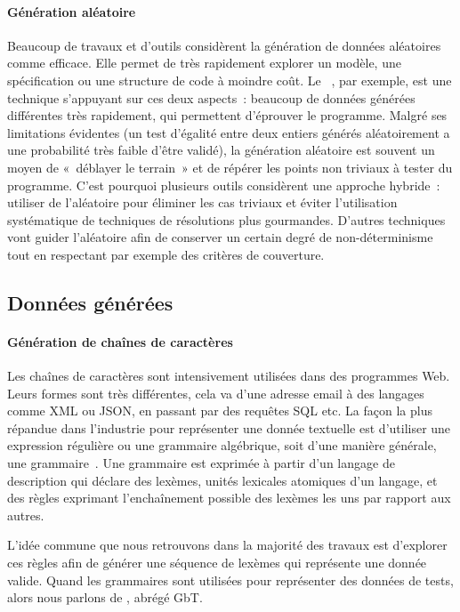 \paragraph{Génération aléatoire} Beaucoup de travaux et d'outils considèrent la
génération de données aléatoires comme efficace. Elle permet de très rapidement
explorer un modèle, une spécification ou une structure de code à moindre coût.
Le ~, par exemple, est une technique
s'appuyant sur ces deux aspects~: beaucoup de données générées différentes très
rapidement, qui permettent d'éprouver le programme. Malgré ses limitations
évidentes (un test d'égalité entre deux entiers générés aléatoirement a une
probabilité très faible d'être validé), la génération aléatoire est souvent un
moyen de «~déblayer le terrain~» et de répérer les points non triviaux à tester
du programme. C'est pourquoi plusieurs outils considèrent une approche hybride~:
utiliser de l'aléatoire pour éliminer les cas triviaux et éviter l'utilisation
systématique de techniques de résolutions plus gourmandes. D'autres techniques
vont guider l'aléatoire afin de conserver un certain degré de non-déterminisme
tout en respectant par exemple des critères de couverture.

\subsection{Données générées}

\paragraph{Génération de chaînes de caractères} Les chaînes de caractères sont
intensivement utilisées dans des programmes Web.  Leurs formes sont très
différentes, cela va d'une adresse email à des langages comme XML ou JSON, en
passant par des requêtes SQL etc. La façon la plus répandue dans l'industrie
pour représenter une donnée textuelle est d'utiliser une expression régulière ou
une grammaire algébrique, soit d'une manière générale, une
grammaire~. Une grammaire est exprimée à partir d'un {\strong
langage de description} qui déclare des {\strong lexèmes}, unités lexicales
atomiques d'un langage, et des {\strong règles} exprimant l'enchaînement
possible des lexèmes les uns par rapport aux autres.

L'idée commune que nous retrouvons dans la majorité des travaux est d'explorer
ces règles afin de générer une {\strong séquence de lexèmes} qui représente une
donnée valide. Quand les grammaires sont utilisées pour représenter des données
de tests, alors nous parlons de , abrégé GbT.

